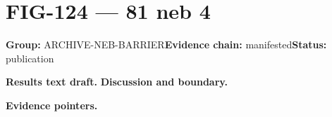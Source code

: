 \clearpage
\section{FIG-124 --- 81 neb 4}
\label{figpage:fig-124}
\textbf{Group:} ARCHIVE-NEB-BARRIER\quad \textbf{Evidence chain:} manifested\quad \textbf{Status:} publication

\textbf{Results text draft.} 
\textbf{Discussion and boundary.} 


\textbf{Evidence pointers.}



\vfill
